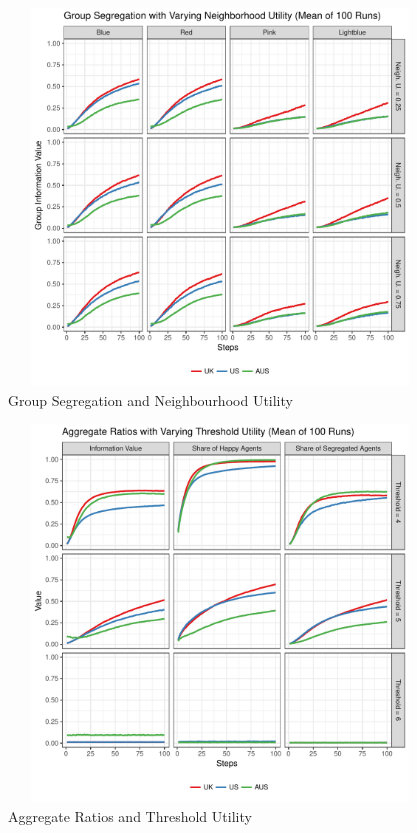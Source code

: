 \documentclass[12pt, a4paper]{article}
\begin{document}
\begin{figure}[bp!]
	\centering
	\caption{Group Segregation and Neighbourhood Utility}
	\includegraphics[height=10cm,width=16cm]{./Plots/all_nb_grp_ratios.pdf}
\end{figure}

\begin{figure}[bp!]
	\centering
	\caption{Aggregate Ratios and Threshold Utility}
	\includegraphics[height=10cm,width=16cm]{./Plots/all_th_agg_ratios.pdf}
\end{figure}
\end{document}
